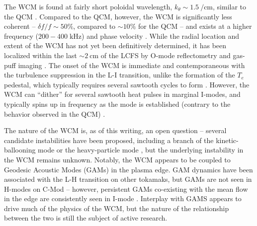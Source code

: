 The WCM is found at fairly short poloidal wavelength, $k_\theta \sim \SI{1.5}{\per\centi\meter}$, similar to the QCM \cite{Dominguez2012}.  Compared to the QCM, however, the WCM is significantly less coherent -- $\delta f/f \sim 50\%$, compared to $\sim 10\%$ for the QCM -- and exists at a higher frequency ($200-400\;\si{\kilo\hertz}$) and phase velocity \cite{Hubbard2011,Cziegler2013}.  While the radial location and extent of the WCM has not yet been definitively determined, it has been localized within the last $\sim \SI{2}{\centi\meter}$ of the LCFS by O-mode reflectometry \cite{Dominguez2012} and gas-puff imaging \cite{Cziegler2011,Cziegler2013}.  The onset of the WCM is immediate and contemporaneous with the turbulence suppression in the L-I transition, unlike the formation of the $T_e$ pedestal, which typically requires several sawtooth cycles to form \cite{Cziegler2011}.  However, the WCM can ``dither'' for several sawtooth heat pulses in marginal I-modes, and typically spins up in frequency as the mode is established (contrary to the behavior observed in the QCM) \cite{Cziegler2011,Hubbard2011}.

The nature of the WCM is, as of this writing, an open question -- several candidate instabilities have been proposed, including a branch of the kinetic-ballooning mode \cite{Tang1980} or the heavy-particle mode \cite{Coppi2012,Coppi2012a}, but the underlying instability in the WCM remains unknown.  Notably, the WCM appears to be coupled to Geodesic Acoustic Modes (GAMs) in the plasma edge.  GAM dynamics have been associated with the L-H transition on other tokamaks, but GAMs are not seen in H-modes on C-Mod -- however, persistent GAMs co-existing with the mean flow in the edge are consistently seen in I-mode \cite{Cziegler2013}.  Interplay with GAMS appears to drive much of the physics of the WCM, but the nature of the relationship between the two is still the subject of active research.




\nicechapterending


